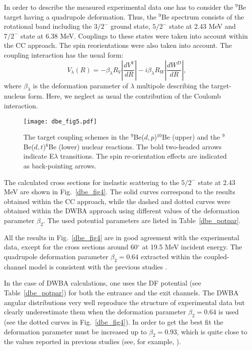\documentclass[
12pt, %
oneside, %
english, %
onehalfspacing, %
onehalfspacing, %
headsepline, %
]{MastersDoctoralThesis} %
\begin{document}
In order to describe the measured experimental data one has to consider the ${}^9$Be target having a quadrupole deformation. Thus, the ${}^9$Be spectrum consists of the rotational band including the  $3/2^-$ ground state, $5/2^-$ state at 2.43 MeV and $7/2^-$ state at 6.38 MeV. Couplings to these states were taken into account within the CC approach. The spin reorientations were also taken into account. The coupling interaction has the usual form:
\begin{equation}
V_\lambda(R)=-\beta_\lambda R_V \left|\frac{d V^V}{dR}\right| - i \beta_\lambda R_W \left|\frac{d W^D}{dR}\right|,
\end{equation}
where $\beta_\lambda$ is the deformation parameter of $\lambda$ multipole describing the target-nucleus form. Here, we neglect as usual the contribution of the Coulomb interaction.




\begin{figure}[bp]
\centering
\texttt{[image: dbe\_fig5.pdf]}
\decoRule
\caption{ \label{dbe_fig5} \footnotesize The target coupling schemes in the ${}^9$Be($d,p$)$^{10}$Be (upper) and the ${}^9$Be($d,t$)$^8$Be (lower) nuclear reactions. The bold two-headed arrows indicate E$\lambda$ transitions. The spin re-orientation effects are indicated as back-pointing arrows.}
\end{figure} 

The calculated cross sections for inelastic scattering to the $5/2^-$ state at 2.43 MeV are shown in Fig.~\ref{dbe_fig4}. The solid curves correspond to the results obtained within the CC approach, while the dashed and dotted curves were obtained within the DWBA approach using  different values of the deformation parameter $\beta_2$. The used potential parameters are listed in Table~\ref{dbe_potpar}.


All the results in Fig.~\ref{dbe_fig4} are in good agreement with the experimental data, except for the cross sections around 60$^\circ$ at 19.5 MeV incident energy. The quadrupole deformation parameter $\beta_2 = 0.64$ extracted within the coupled-channel model is consistent with the previous studies \cite{lukyanov2014study, harakeh1980strong}.

In the case of DWBA calculations, one uses the DF potential (see Table~\ref{dbe_potpar}) for both the entrance and the exit channels. The DWBA angular distributions very well reproduce the structure of experimental data but clearly underestimate them when the deformation parameter $\beta_2 = 0.64$ is used (see the dotted curves in Fig.~\ref{dbe_fig4}). In order to get the best fit the deformation parameter must be increased up to $\beta_2 = 0.93$, which is quite close to the values reported in previous studies (see, for example, \cite{bodek1989, votava1973}).
\end{document}
